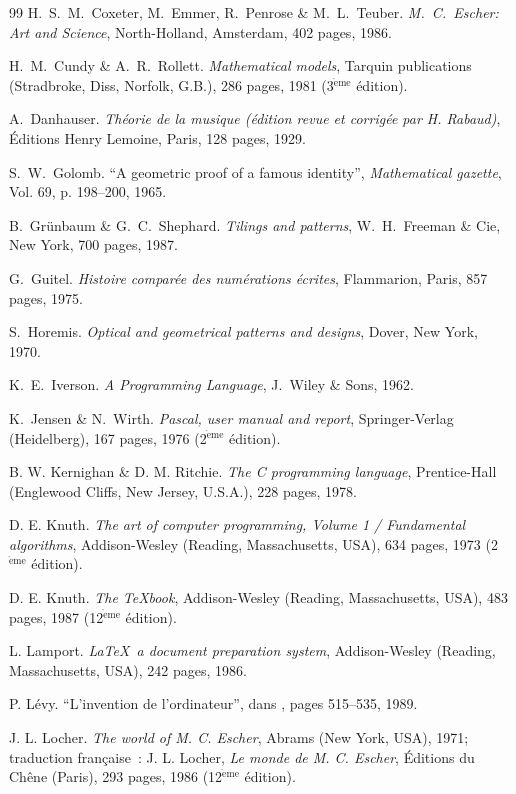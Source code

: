 \begin{thebibliography}{99}
 H.~S.~M.~Coxeter, M.~Emmer, R.~Penrose \& M.~L.~Teuber.
{\em M.~C.~Escher: Art and Science}, North-Holland, Amsterdam, 
402 pages, 1986.

 H.~M.~Cundy \& A.~R.~Rollett.
{\em Mathematical models}, Tarquin publications (Stradbroke, Diss, Norfolk, G.B.), 
286 pages, 1981 (3$^{\mathrm{\grave{e}me}}$ édition).

 A.~Danhauser.
{\em Théorie de la musique (édition revue et corrigée par H. Rabaud)}, 
Éditions Henry Lemoine, Paris, 128  pages, 1929.

 S.~W.~Golomb.
``A geometric proof of a famous identity'', 
{\em Mathematical gazette}, Vol. 69, p. 198--200, 1965.

 B.~Grünbaum \& G.~C.~Shephard.
{\em Tilings and patterns}, W.~H.~Freeman \& Cie, New York, 700 pages, 1987.

 G.~Guitel.
{\em Histoire comparée des numérations écrites}, 
Flammarion, Paris, 857 pages, 1975.

 S.~Horemis.
{\em Optical and geometrical patterns and designs}, Dover, New York, 1970.

 K.~E.~Iverson.
{\em A Programming Language}, J.~Wiley \& Sons, 1962.

 K.~Jensen \& N.~Wirth.
{\em Pascal, user manual and report}, Springer-Verlag (Heidelberg), 
167 pages, 1976 (2$^{\mathrm{\grave{e}me}}$ édition).

 B. W. Kernighan \& D. M. Ritchie.
{\em The C programming language}, Prentice-Hall (Englewood Cliffs, New Jersey, U.S.A.),
228 pages, 1978.

 D. E. Knuth.
{\em The art of computer programming, Volume 1 / Fundamental algorithms}, 
Addison-Wesley (Reading, Massachusetts, USA), 
634 pages, 1973 (2$^{\mathrm{\grave{e}me}}$ édition).

 D. E. Knuth.
{\em The \TeX book}, Addison-Wesley (Reading, Massachusetts, USA), 
483 pages, 1987 (12$^{\mathrm{\grave{e}me}}$ édition).

 L. Lamport.
{\em \LaTeX\ a document preparation system}, Addison-Wesley (Reading, Massachusetts, USA), 
242 pages, 1986.

 P. Lévy.
``L'invention de l'ordinateur'', \rm dans \cite{serres1}, pages 515--535, 1989.

 J. L. Locher.
{\em The world of M. C. Escher}, Abrams (New York, USA), 1971\/\/;
{\footnotesize traduction française~:} J. L. Locher,
{\em Le monde de M. C. Escher}, Éditions du Chêne (Paris), 
293 pages, 1986 (12$^{\mathrm{\grave{e}me}}$ édition).


\end{thebibliography}
